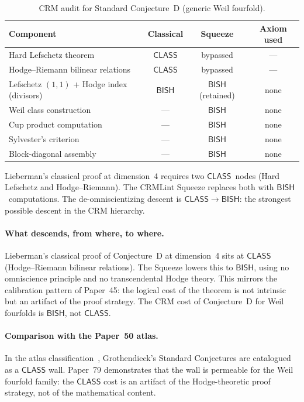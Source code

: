 \documentclass[11pt]{article}
\theoremstyle{plain}
\theoremstyle{definition}
\theoremstyle{remark}
\newcommand{\BISH}{\mathsf{BISH}}
\newcommand{\CLASS}{\mathsf{CLASS}}
\begin{document}
\begin{table}[ht]
\centering
\caption{CRM audit for Standard Conjecture~D (generic Weil fourfold).}
\label{tab:audit}
\begin{tabular}{lccc}
\toprule
\textbf{Component} & \textbf{Classical} & \textbf{Squeeze} &
\textbf{Axiom used} \\
\midrule
Hard Lefschetz theorem
  & $\CLASS$  & bypassed & --- \\
Hodge--Riemann bilinear relations
  & $\CLASS$  & bypassed & --- \\
Lefschetz $(1,1)$ + Hodge index (divisors)
  & $\BISH$  & $\BISH$ (retained) & none \\
Weil class construction
  & ---       & $\BISH$ & none \\
Cup product computation
  & ---       & $\BISH$ & none \\
Sylvester's criterion
  & ---       & $\BISH$ & none \\
Block-diagonal assembly
  & ---       & $\BISH$ & none \\
\bottomrule
\end{tabular}
\end{table}

Lieberman's classical proof at dimension~4 requires two $\CLASS$~nodes
(Hard Lefschetz and Hodge--Riemann).  The CRMLint Squeeze replaces both
with $\BISH$~computations.
The de-omniscientizing descent is $\CLASS \to \BISH$: the strongest possible
descent in the CRM hierarchy.

\paragraph{What descends, from where, to where.}
Lieberman's classical proof of Conjecture~D at dimension~4 sits at
$\CLASS$ (Hodge--Riemann bilinear relations).  The Squeeze lowers this to
$\BISH$, using no omniscience principle and no transcendental Hodge theory.
This mirrors
the calibration pattern of Paper~45: the logical cost of the theorem is not
intrinsic but an artifact of the proof strategy.  The CRM cost of
Conjecture~D for Weil fourfolds is $\BISH$, not $\CLASS$.

\paragraph{Comparison with the Paper~50 atlas.}
In the atlas classification~\cite{paper50}, Grothendieck's Standard
Conjectures are catalogued as a $\CLASS$ wall.  Paper~79 demonstrates
that the wall is permeable for the Weil fourfold family: the $\CLASS$ cost
is an artifact of the Hodge-theoretic proof strategy, not of the
mathematical content.
\end{document}
